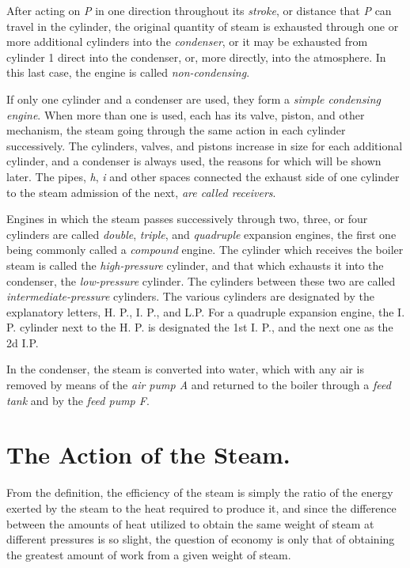 \documentclass[11pt, a5paper]{book}
\begin{document}
After acting on \textit{P} in one direction throughout its
\textit{stroke}, or distance that \textit{P} can travel in the
cylinder, the original quantity of steam is exhausted through one or
more additional cylinders into the \textit{condenser}, or it may be
exhausted from cylinder 1 direct into the condenser, or, more
directly, into the atmosphere.  In this last case, the engine is
called \textit{non-condensing}.\par

If only one cylinder and a condenser are used, they form a
\textit{simple condensing engine}.  When more than one is used, each
has its valve, piston, and other mechanism, the steam going through
the same action in each cylinder successively.  The cylinders, valves,
and pistons increase in size for each additional cylinder, and a
condenser is always used, the reasons for which will be shown later.
The pipes, \textit{h}, \textit{i} and other spaces connected the
exhaust side of one cylinder to the steam admission of the next,
\textit{are called receivers}.\par

Engines in which the steam passes successively through two, three, or
four cylinders are called \textit{double}, \textit{triple}, and
\textit{quadruple} expansion engines, the first one being commonly
called a \textit{compound} engine.  The cylinder which receives the
boiler steam is called the \textit{high-pressure} cylinder, and that
which exhausts it into the condenser, the \textit{low-pressure}
cylinder.  The cylinders between these two are called
\textit{intermediate-pressure} cylinders.  The various cylinders are
designated by the explanatory letters, H. P., I. P., and L.P\@.  For a
quadruple expansion engine, the I. P. cylinder next to the H. P. is
designated the 1st I. P., and the next one as the 2d I.P.\par

In the condenser, the steam is converted into water, which with any
air is removed by means of the \textit{air pump A} and returned to the
boiler through a \textit{feed tank} and by the \textit{feed pump F}.\par

\chapter{The Action of the Steam.}

From the definition, the efficiency of the steam is simply the ratio
of the energy exerted by the steam to the heat required to produce it,
and since the difference between the amounts of heat utilized to
obtain the same weight of steam at different pressures is so slight,
the question of economy is only that of obtaining the greatest amount
of work from a given weight of steam.\par
\end{document}
